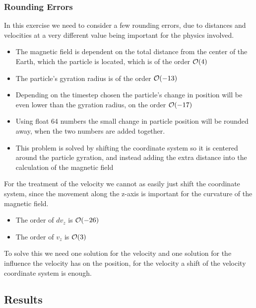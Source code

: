 \documentclass[x11names]{article}
\begin{document}
\subsubsection{Rounding Errors}
      In this exercise we need to consider a few rounding errors, due to distances and velocities at a very different value being important for the physics involved.
      \begin{itemize}
            \item The magnetic field is dependent on the total distance from the center of the Earth, which the particle is located, which is of the order \(\order{4}\)
            \item The particle's gyration radius is of the order \(\order{-13}\)
            \item Depending on the timestep chosen the particle's change in position will be even lower than the gyration radius, on the order \(\order{-17}\)
            \item Using float 64 numbers the small change in particle position will be rounded away, when the two numbers are added together.
            \item This problem is solved by shifting the coordinate system so it is centered around the particle gyration, and instead adding the extra distance into the calculation of the magnetic field
      \end{itemize}

      For the treatment of the velocity we cannot as easily just shift the coordinate system, since the movement along the z-axis is important for the curvature of the magnetic field.
      \begin{itemize}
            \item The order of \(dv_z\) is \( \order{-26} \)
            \item The order of \(v_z\) is \( \order{3} \)
      \end{itemize}

      To solve this we need one solution for the velocity and one solution for the influence the velocity has on the position, for the velocity a shift of the velocity coordinate system is enough.
      



\subsection{Results}

      

\appendix
\end{document}
